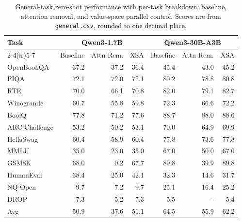 \begin{table}[t]
  \caption{General-task zero-shot performance with per-task breakdown:
  baseline, attention removal, and value-space parallel control.
  Scores are from \texttt{general.csv}, rounded to one decimal place.}
  \label{tab:general-zeroshot}
  \centering
  \scriptsize
  \setlength{\tabcolsep}{4pt}
  \begin{tabular}{lrrrrrr}
    \toprule
    \multirow{2}{*}{Task} & \multicolumn{3}{c}{Qwen3-1.7B} & \multicolumn{3}{c}{Qwen3-30B-A3B} \\
    \cmidrule(lr){2-4}\cmidrule(lr){5-7}
      & Baseline & Attn Rem. & XSA & Baseline & Attn Rem. & XSA \\
    \midrule
    OpenBookQA & 37.2 & 37.2 & 36.4 & 45.4 & 43.0 & 45.2 \\
    PIQA & 72.1 & 72.0 & 72.1 & 80.2 & 78.8 & 80.8 \\
    RTE & 70.0 & 66.1 & 70.8 & 82.0 & 79.1 & 82.7 \\
    Winogrande & 60.7 & 55.8 & 59.8 & 72.3 & 66.6 & 72.2 \\
    BoolQ & 77.8 & 71.2 & 77.6 & 88.7 & 88.0 & 88.6 \\
    ARC-Challenge & 53.2 & 50.2 & 53.1 & 70.0 & 64.9 & 69.9 \\
    HellaSwag & 60.4 & 58.9 & 60.4 & 77.8 & 73.6 & 77.8 \\
    MMLU & 35.0 & 23.0 & 35.0 & 67.0 & 50.0 & 67.0 \\
    GSM8K & 68.0 & 0.2 & 67.7 & 89.8 & 39.9 & 89.8 \\
    HumanEval & 38.4 & 25.0 & 42.1 & 32.3 & 14.6 & 31.7 \\
    NQ-Open & 9.7 & 7.2 & 9.7 & 25.1 & 16.4 & 25.2 \\
    DROP & 7.3 & 5.2 & 7.3 & 5.5 & -- & 5.4 \\
    \midrule
    Avg & 50.9 & 37.6 & 51.1 & 64.5 & 55.9 & 62.2 \\
    \bottomrule
  \end{tabular}
\end{table}

